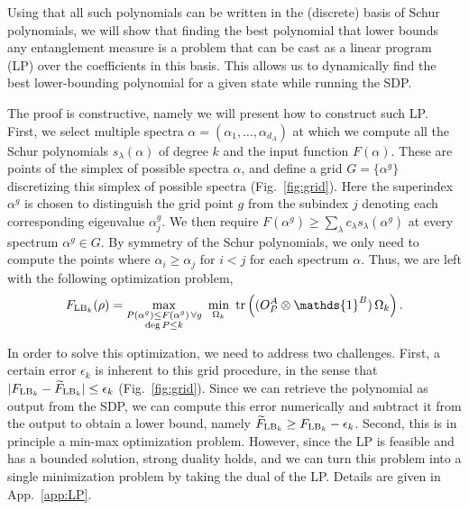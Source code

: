 \documentclass[aps,pra,twocolumn,superscriptaddress]{revtex4-2}
\newcommand{\one}{\mathds{1}}
\newcommand{\I}{\one}
\renewcommand{\a}{\alpha}
\begin{document}
Using that all such polynomials can be written in the (discrete) basis of Schur polynomials, we will show that finding the best polynomial that lower bounds any entanglement measure is a problem that can be cast as a linear program (LP) over the coefficients in this basis. This allows us to dynamically find the best lower-bounding polynomial for a given state while running the SDP.

The proof is constructive, namely we will present how to construct such LP. First, we select multiple spectra $\a=(\a_1, \dots, \a_{d_A})$ at which we compute all the Schur polynomials $s_\lambda(\a)$ of degree $k$ and the input function $F(\a)$. These are points of the simplex of possible spectra $\alpha$, and define a grid $G=\{\a^g\}$ discretizing this simplex of possible spectra (Fig.~\ref{fig:grid}). Here the superindex $\a^g$ is chosen to distinguish the grid point $g$ from the subindex $j$ denoting each corresponding eigenvalue $\a^g_j$. We then require $F(\a^g) \geq \sum_\lambda c_\lambda s_\lambda(\a^g)$ at every spectrum $\a^g\in G$. By symmetry of the Schur polynomials, we only need to compute the points where $\a_i \geq \a_j$ for $i < j$ for each spectrum $\a$.
Thus, we are left with the following optimization problem,
\begin{equation}\label{eq:FLBgrid}
    F_{{\rm LB}_k}(\rho)=\max_{\substack{P(\a^g)\leq F(\a^g)\,\forall g\\ \deg P\leq k}}\ \min_{\Omega_k}\ \tr\left((O_P^A\otimes\I^B)\,\Omega_k\right).
\end{equation}

In order to solve this optimization, we need to address two challenges. First, a certain error $\epsilon_k$ is inherent to this grid procedure, in the sense that $|F_{{\rm LB}_k}-\widetilde{F}_{{\rm LB}_k}|\leq \epsilon_k$ (Fig.~\ref{fig:grid}).
Since we can retrieve the polynomial as output from the SDP, we can compute this error numerically and subtract it from the output to obtain a lower bound, namely $\widetilde{F}_{{\rm LB}_k}\geq F_{{\rm LB}_k} - \epsilon_k$. Second, this is in principle a min-max optimization problem. However, since the LP is feasible and has a bounded solution, strong duality holds, and we can turn this problem into a single minimization problem by taking the dual of the LP. Details are given in App.~\ref{app:LP}.
\end{document}
